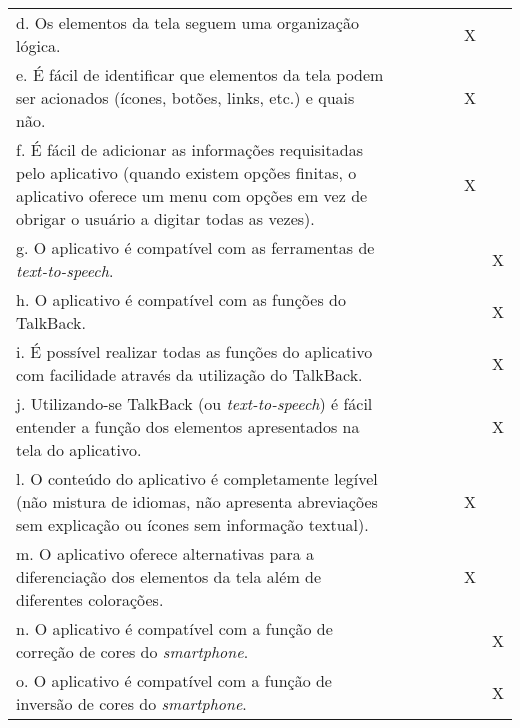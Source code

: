 \documentclass[portuguese,oneside]{tcc}
\begin{document}
\begin{table}[h]
{\begin{tabu}{|L{25em}|c|c|c|c|c|c|}
							d. Os elementos da tela seguem uma organização lógica. & & & & & X & \\ 
							e. É fácil de identificar que elementos da tela podem ser acionados (ícones, botões, links, etc.) e quais não. & & & & & X & \\ 
							f. É fácil de adicionar as informações requisitadas pelo aplicativo (quando existem opções finitas, o aplicativo oferece um menu com opções em vez de obrigar o usuário a digitar todas as vezes). & & & & & X & \\ 
							g. O aplicativo é compatível com as ferramentas de \emph{text-to-speech}. & & & & & & X \\ 
							h. O aplicativo é compatível com as funções do TalkBack. & & & & & & X \\ 
							i. É possível realizar todas as funções do aplicativo com facilidade através da utilização do TalkBack.	& & & & & & X \\ 
							j. Utilizando-se TalkBack (ou \emph{text-to-speech}) é fácil entender a função dos elementos apresentados na tela do aplicativo. & & & & & & X \\ 
							l. O conteúdo do aplicativo é completamente legível (não mistura de idiomas, não apresenta abreviações sem explicação ou ícones sem informação textual). & & & & & X & \\ 
							m. O aplicativo oferece alternativas para a diferenciação dos elementos da tela além de diferentes colorações. & & & & & X & \\ 
							n. O aplicativo é compatível com a função de correção de cores do \emph{smartphone}. & & & & & & X \\ 
							o. O aplicativo é compatível com a função de inversão de cores do \emph{smartphone}. & & & & & & X \\ 
						\end{tabu}}
					\end{table}
					
\end{document}
